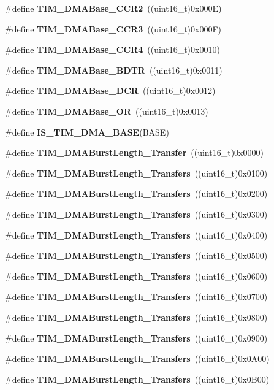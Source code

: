 \begin{DoxyCompactItemize}
\item 
\#define \textbf{ T\+I\+M\+\_\+\+D\+M\+A\+Base\+\_\+\+C\+C\+R2}~((uint16\+\_\+t)0x000\+E)
\item 
\#define \textbf{ T\+I\+M\+\_\+\+D\+M\+A\+Base\+\_\+\+C\+C\+R3}~((uint16\+\_\+t)0x000\+F)
\item 
\#define \textbf{ T\+I\+M\+\_\+\+D\+M\+A\+Base\+\_\+\+C\+C\+R4}~((uint16\+\_\+t)0x0010)
\item 
\#define \textbf{ T\+I\+M\+\_\+\+D\+M\+A\+Base\+\_\+\+B\+D\+TR}~((uint16\+\_\+t)0x0011)
\item 
\#define \textbf{ T\+I\+M\+\_\+\+D\+M\+A\+Base\+\_\+\+D\+CR}~((uint16\+\_\+t)0x0012)
\item 
\#define \textbf{ T\+I\+M\+\_\+\+D\+M\+A\+Base\+\_\+\+OR}~((uint16\+\_\+t)0x0013)
\item 
\#define \textbf{ I\+S\+\_\+\+T\+I\+M\+\_\+\+D\+M\+A\+\_\+\+B\+A\+SE}(B\+A\+SE)
\item 
\#define \textbf{ T\+I\+M\+\_\+\+D\+M\+A\+Burst\+Length\+\_\+Transfer}~((uint16\+\_\+t)0x0000)
\item 
\#define \textbf{ T\+I\+M\+\_\+\+D\+M\+A\+Burst\+Length\+\_\+Transfers}~((uint16\+\_\+t)0x0100)
\item 
\#define \textbf{ T\+I\+M\+\_\+\+D\+M\+A\+Burst\+Length\+\_\+Transfers}~((uint16\+\_\+t)0x0200)
\item 
\#define \textbf{ T\+I\+M\+\_\+\+D\+M\+A\+Burst\+Length\+\_\+Transfers}~((uint16\+\_\+t)0x0300)
\item 
\#define \textbf{ T\+I\+M\+\_\+\+D\+M\+A\+Burst\+Length\+\_\+Transfers}~((uint16\+\_\+t)0x0400)
\item 
\#define \textbf{ T\+I\+M\+\_\+\+D\+M\+A\+Burst\+Length\+\_\+Transfers}~((uint16\+\_\+t)0x0500)
\item 
\#define \textbf{ T\+I\+M\+\_\+\+D\+M\+A\+Burst\+Length\+\_\+Transfers}~((uint16\+\_\+t)0x0600)
\item 
\#define \textbf{ T\+I\+M\+\_\+\+D\+M\+A\+Burst\+Length\+\_\+Transfers}~((uint16\+\_\+t)0x0700)
\item 
\#define \textbf{ T\+I\+M\+\_\+\+D\+M\+A\+Burst\+Length\+\_\+Transfers}~((uint16\+\_\+t)0x0800)
\item 
\#define \textbf{ T\+I\+M\+\_\+\+D\+M\+A\+Burst\+Length\+\_\+Transfers}~((uint16\+\_\+t)0x0900)
\item 
\#define \textbf{ T\+I\+M\+\_\+\+D\+M\+A\+Burst\+Length\+\_\+Transfers}~((uint16\+\_\+t)0x0\+A00)
\item 
\#define \textbf{ T\+I\+M\+\_\+\+D\+M\+A\+Burst\+Length\+\_\+Transfers}~((uint16\+\_\+t)0x0\+B00)

\end{DoxyCompactItemize}
